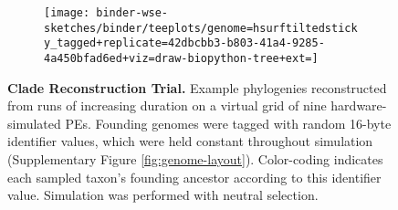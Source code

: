 \begin{figure}
\begin{subfigure}[c]{\linewidth} \centering
  \begin{minipage}[c]{0.08\linewidth} \flushright
    \caption{}
    \label{fig:tagged_250}
  \end{minipage}%
  \begin{minipage}[c]{0.92\linewidth}
    \texttt{[image: binder-wse-sketches/binder/teeplots/genome=hsurftiltedsticky\_tagged+replicate=42dbcbb3-b803-41a4-9285-4a450bfad6ed+viz=draw-biopython-tree+ext=]}
  \end{minipage}%
\end{subfigure}

\vspace{-2ex}

\caption{%
\textbf{Clade Reconstruction Trial.}
\footnotesize
Example phylogenies reconstructed from runs of increasing duration on a virtual grid of nine hardware-simulated PEs.
Founding genomes were tagged with random 16-byte identifier values, which were held constant throughout simulation (Supplementary Figure \ref{fig:genome-layout}).
Color-coding indicates each sampled taxon's founding ancestor according to this identifier value.
Simulation was performed with neutral selection.
}
\label{fig:tagged}
\vspace{-0.2in}
\end{figure}

